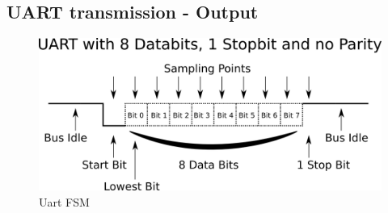 \documentclass[12pt,a4 paper] {report}
\begin{document}
\subsection*{UART transmission - Output}
\begin{figure}[h]
	\centering	
	\includegraphics[scale=0.5]{../png/rs232image.png}
	\caption{Uart FSM}
\end{figure}

\newpage
\end{document}
